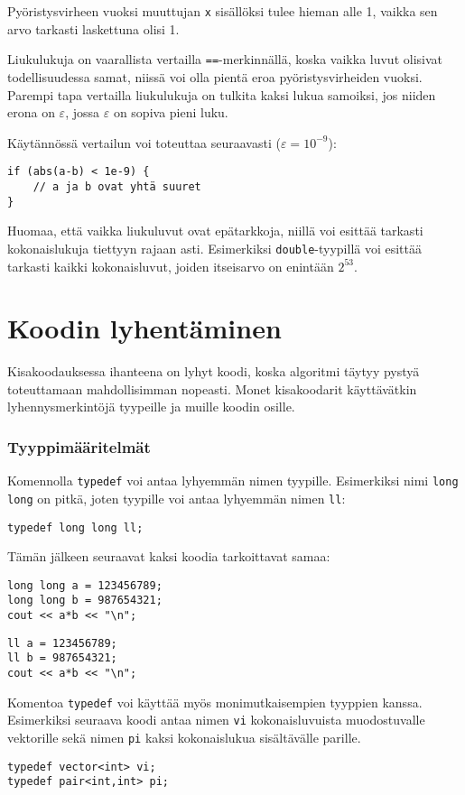 Pyöristysvirheen vuoksi muuttujan \texttt{x}
sisällöksi tulee hieman alle 1,
vaikka sen arvo tarkasti laskettuna olisi 1.

Liukulukuja on vaarallista vertailla \texttt{==}-merkinnällä,
koska vaikka luvut olisivat todellisuudessa samat,
niissä voi olla pientä eroa pyöristysvirheiden vuoksi.
Parempi tapa vertailla liukulukuja on
tulkita kaksi lukua samoiksi, jos niiden erona on $\varepsilon$,
jossa $\varepsilon$ on sopiva pieni luku.

Käytännössä vertailun voi toteuttaa seuraavasti ($\varepsilon=10^{-9}$):

\begin{lstlisting}
if (abs(a-b) < 1e-9) {
    // a ja b ovat yhtä suuret
}
\end{lstlisting}

Huomaa, että
vaikka liukuluvut ovat epätarkkoja, niillä voi esittää
tarkasti kokonaislukuja tiettyyn rajaan asti.
Esimerkiksi \texttt{double}-tyypillä voi esittää
tarkasti kaikki kokonaisluvut, joiden itseisarvo
on enintään $2^{53}$.

\section{Koodin lyhentäminen}

Kisakoodauksessa ihanteena on lyhyt koodi,
koska algoritmi täytyy pystyä toteuttamaan
mahdollisimman nopeasti.
Monet kisakoodarit käyttävätkin lyhennysmerkintöjä
tyypeille ja muille koodin osille.

\subsubsection{Tyyppimääritelmät}

Komennolla \texttt{typedef} voi antaa lyhyemmän
nimen tyypille.
Esimerkiksi nimi \texttt{long long} on pitkä,
joten tyypille voi antaa lyhyemmän nimen \texttt{ll}:
\begin{lstlisting}
typedef long long ll;
\end{lstlisting}
Tämän jälkeen seuraavat kaksi koodia tarkoittavat samaa:
\begin{lstlisting}
long long a = 123456789;
long long b = 987654321;
cout << a*b << "\n";
\end{lstlisting}
\begin{lstlisting}
ll a = 123456789;
ll b = 987654321;
cout << a*b << "\n";
\end{lstlisting}
Komentoa \texttt{typedef} voi käyttää myös
monimutkaisempien tyyppien kanssa.
Esimerkiksi seuraava koodi antaa nimen \texttt{vi}
kokonaisluvuista muodostuvalle vektorille
sekä nimen \texttt{pi} kaksi
kokonaislukua sisältävälle parille.
\begin{lstlisting}
typedef vector<int> vi;
typedef pair<int,int> pi;
\end{lstlisting}

